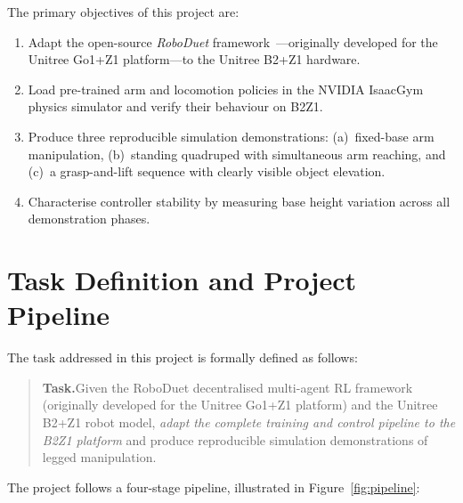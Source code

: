 The primary objectives of this project are:

\begin{enumerate}
  \item Adapt the open-source \textit{RoboDuet}
        framework~\cite{pan2024roboduet}---originally developed for the
        Unitree Go1+Z1 platform---to the Unitree B2+Z1 hardware.
  \item Load pre-trained arm and locomotion policies in the NVIDIA
        IsaacGym~\cite{makoviychuk2021isaac} physics simulator and verify
        their behaviour on B2Z1.
  \item Produce three reproducible simulation demonstrations:
        (a)~fixed-base arm manipulation,
        (b)~standing quadruped with simultaneous arm reaching, and
        (c)~a grasp-and-lift sequence with clearly visible object elevation.
  \item Characterise controller stability by measuring base height variation
        across all demonstration phases.
\end{enumerate}

\section{Task Definition and Project Pipeline}
\label{sec:task}

The task addressed in this project is formally defined as follows:

\begin{quote}
\textbf{Task.}\enspace Given the RoboDuet decentralised multi-agent RL
framework (originally developed for the Unitree Go1+Z1 platform) and
the Unitree B2+Z1 robot model, \emph{adapt the complete training and
control pipeline to the B2Z1 platform} and produce reproducible
simulation demonstrations of legged manipulation.
\end{quote}

\noindent
The project follows a four-stage pipeline, illustrated in
Figure~\ref{fig:pipeline}:

